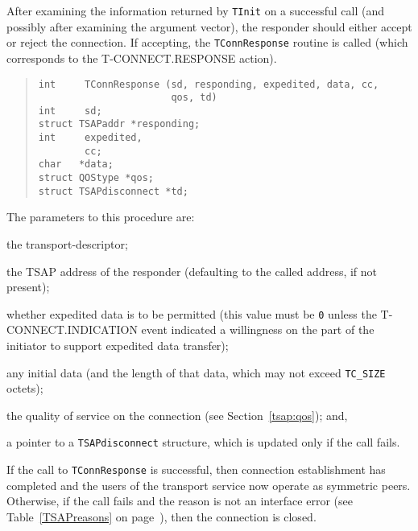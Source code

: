 After examining the information returned by \verb"TInit" on a successful call
(and possibly after examining the argument vector),
the responder should either accept or reject the connection.
If accepting, the \verb"TConnResponse" routine is called
(which corresponds to the {\sf T-CONNECT.RESPONSE\/} action).
\begin{quote}\small\begin{verbatim}
int     TConnResponse (sd, responding, expedited, data, cc,
                       qos, td)
int     sd;
struct TSAPaddr *responding;
int     expedited,
        cc;
char   *data;
struct QOStype *qos;
struct TSAPdisconnect *td;
\end{verbatim}\end{quote}
The parameters to this procedure are:
\begin{describe}
\item[\verb"sd":] the transport-descriptor;

\item[\verb"responding":] the TSAP address of the responder
(defaulting to the called address, if not present);

\item[\verb"expedited":] whether expedited data is to be permitted
(this value must be \verb"0" unless the {\sf T-CONNECT.INDICATION\/} event
indicated a willingness on the part of the initiator to support expedited
data transfer);

\item[\verb"data"/\verb"cc":] any initial data
(and the length of that data,
which may not exceed \verb"TC_SIZE" octets);

\item[\verb"qos":] the quality of service on the connection
(see Section~\ref{tsap:qos});
and,

\item[\verb"td":] a pointer to a \verb"TSAPdisconnect" structure, which is
updated only if the call fails.
\end{describe}
If the call to \verb"TConnResponse" is successful,
then connection establishment has completed
and the users of the transport service now operate as symmetric peers.
Otherwise, if the call fails and the reason is not an interface error
(see Table~\ref{TSAPreasons} on page~\pageref{TSAPreasons}),
then the connection is closed.

